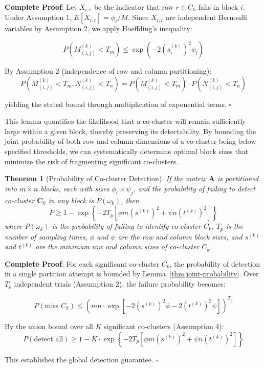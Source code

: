 \documentclass[journal]{IEEEtran}
\newtheorem{theorem}{Theorem}
\begin{document}
{\color{blue}
\textbf{Complete Proof}: Let $X_{i,r}$ be the indicator that row $r \in C_k$ falls in block $i$. Under Assumption 1, $E[X_{i,r}] = \phi_i/M$. Since $X_{i,r}$ are independent Bernoulli variables by Assumption 2, we apply Hoeffding's inequality:

$$P(M_{(i,j)}^{(k)} < T_m) \leq \exp\left(-2(s_i^{(k)})^2 \phi_i\right)$$

By Assumption 2 (independence of row and column partitioning):
$$P(M_{(i,j)}^{(k)} < T_m, N_{(i,j)}^{(k)} < T_n) = P(M_{(i,j)}^{(k)} < T_m) \cdot P(N_{(i,j)}^{(k)} < T_n)$$

yielding the stated bound through multiplication of exponential terms. $\square$
}

This lemma quantifies the likelihood that a co-cluster will remain sufficiently large within a given block, thereby preserving its detectability. By bounding the joint probability of both row and column dimensions of a co-cluster being below specified thresholds, we can systematically determine optimal block sizes that minimize the risk of fragmenting significant co-clusters.

\begin{theorem}[Probability of Co-cluster Detection]
    \label{thm:probability-co-cluster-detection}
    If the matrix $\mathbf{A}$ is partitioned into $m \times n$ blocks, each with sizes $\phi_i \times \psi_j$, and the probability of failing to detect co-cluster $\mathbf{C}_k$ in any block is $P(\omega_k)$, then
    \begin{equation}
        P \geq 1 - \exp \left\{ -2 T_p \left[ \phi m (s^{(k)})^2 + \psi n (t^{(k)})^2 \right] \right\}
        \label{eq:prob-of-identifying-all-co-clusters}
    \end{equation}
    where $P(\omega_k)$ is the probability of failing to identify co-cluster $C_k$, $T_p$ is the number of sampling times, $\phi$ and $\psi$ are the row and column block sizes, and $s^{(k)}$ and $t^{(k)}$ are the minimum row and column sizes of co-cluster $C_k$.
\end{theorem}

{\color{blue}
\textbf{Complete Proof}: For each significant co-cluster $C_k$, the probability of detection in a single partition attempt is bounded by Lemma~\ref{thm:joint-probability}. Over $T_p$ independent trials (Assumption 2), the failure probability becomes:

$$P(\text{miss } C_k) \leq \left(mn \cdot \exp\left[-2(s^{(k)})^2\phi - 2(t^{(k)})^2\psi\right]\right)^{T_p}$$

By the union bound over all $K$ significant co-clusters (Assumption 4):
$$P(\text{detect all}) \geq 1 - K \cdot \exp\left\{-2T_p[\phi m (s^{(k)})^2 + \psi n (t^{(k)})^2]\right\}$$

This establishes the global detection guarantee. $\square$
}
\end{document}
